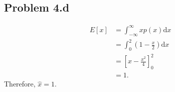 \subsection*{Problem 4.d}
\begin{align*}
E[x] &= \int_{-\infty}^{\infty} xp(x)\text{d}x\\
	&= \int_{0}^{2}(1-\frac{x}{2})\text{d}x\\
	&= \left[x-\frac{x^2}{4}\right]_0^2\\
	&= 1.
\end{align*}
Therefore, $\hat{x} = 1.$
